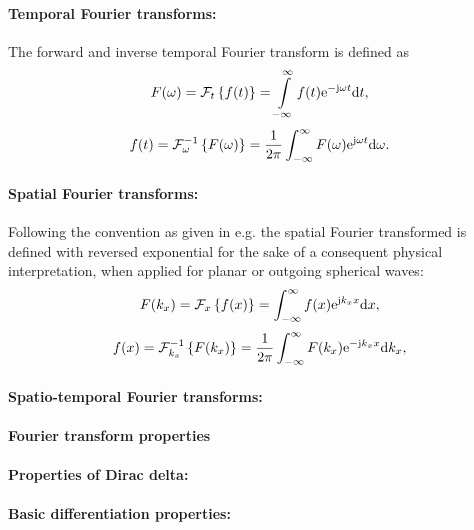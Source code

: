 \printnomenclature
%
\vspace{1cm}
\paragraph{Temporal Fourier transforms:}
The forward and inverse temporal Fourier transform is defined as 
\begin{equation}
\label{eq:temporal_fourier_transform_def}
F(\omega) = \mathcal{F}_t \left\{ f(t) \right\} = \int\limits_ {-\infty}^{\infty} f(t) \mathrm{e}^{-\mathrm{j} \omega t} \mathrm{d} t,
\end{equation}
\begin{equation}
\label{eq:temporal_inverse_fourier_transform_def}
f(t) = \mathcal{F}_{\omega}^{-1} \left\{ F(\omega) \right\} = \frac{1}{2\pi} \int_ {-\infty}^{\infty} F(\omega) \mathrm{e}^{ \mathrm{j} \omega t} \mathrm{d} \omega.
\end{equation}
%
\paragraph{Spatial Fourier transforms:}
Following the convention as given in e.g. \cite{Williams1999} the spatial Fourier transformed is defined with reversed exponential for the sake of a consequent physical interpretation, when applied for planar or outgoing spherical waves:
\begin{equation}
\label{eq:spatial_fourier_transform_def}
F(k_x) = \mathcal{F}_x \left\{ f(x) \right\} = \int_ {-\infty}^{\infty} f(x) \mathrm{e}^{\mathrm{j} k_x x} \mathrm{d} x,
\end{equation}
\begin{equation}
\label{eq:spatial_inverse_fourier_transform_def}
f(x) = \mathcal{F}_{k_x}^{-1} \left\{ F(k_x) \right\} = \frac{1}{2\pi} \int_ {-\infty}^{\infty} F(k_x) \mathrm{e}^{ -\mathrm{j} k_x x} \mathrm{d} k_x,
\end{equation}

\paragraph{Spatio-temporal Fourier transforms:}
\paragraph{Fourier transform properties}

\paragraph{Properties of Dirac delta:}
 
\paragraph{Basic differentiation properties:}